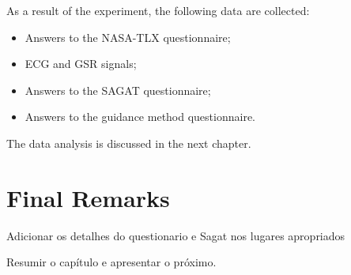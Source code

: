 As a result of the experiment, the following data are collected:

\begin{itemize}
    \item Answers to the NASA-TLX questionnaire;
    \item ECG and GSR signals;
    \item Answers to the SAGAT questionnaire;
    \item Answers to the guidance method questionnaire.
\end{itemize}

The data analysis is discussed in the next chapter.

\section{Final Remarks}

Adicionar os detalhes do questionario e Sagat nos lugares apropriados

Resumir o capítulo e apresentar o próximo.